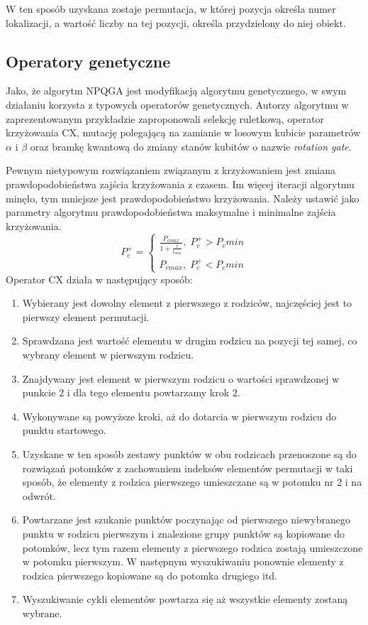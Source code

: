 W ten sposób uzyskana zostaje permutacja, w której pozycja określa numer lokalizacji, a wartość liczby na tej pozycji, określa przydzielony do niej obiekt.

\subsection{Operatory genetyczne}
Jako, że algorytm NPQGA jest modyfikacją algorytmu genetycznego, w swym działaniu korzysta z typowych operatorów genetycznych. Autorzy algorytmu w zaprezentowanym przykładzie zaproponowali selekcję ruletkową, operator krzyżowania CX, mutację polegającą na zamianie w losowym kubicie parametrów $\alpha$ i $\beta$ oraz bramkę kwantową do zmiany stanów kubitów o nazwie \textit{rotation gate}.

Pewnym nietypowym rozwiązaniem związanym z krzyżowaniem jest zmiana prawdopodobieństwa zajścia krzyżowania z czasem. Im więcej iteracji algorytmu minęło, tym mniejsze jest prawdopodobieństwo krzyżowania. Należy ustawić jako parametry algorytmu prawdopodobieństwa maksymalne i minimalne zajścia krzyżowania.
\newline
\begin{equation}
P_c^+= \left\{ \begin{array}{ccc} \frac{P_{c max}}{1+\frac{t}{t_{max}}}, \; P_c^+ > P_c min \\ P_{c max}, \; P_c^+ < P_c min \end{array} \right.
\end{equation}
\newline
Operator CX działa w następujący sposób:
\begin{enumerate}
\item Wybierany jest dowolny element z pierwszego z rodziców, najczęściej jest to pierwszy element permutacji.
\item Sprawdzana jest wartość elementu w drugim rodzicu na pozycji tej samej, co wybrany element w pierwszym rodzicu.
\item Znajdywany jest element w pierwszym rodzicu o wartości sprawdzonej w punkcie 2 i dla tego elementu powtarzamy krok 2.
\item Wykonywane są powyższe kroki, aż do dotarcia w pierwszym rodzicu do punktu startowego.
\item Uzyskane w ten sposób zestawy punktów w obu rodzicach przenoszone są do rozwiązań potomków z zachowaniem indeksów elementów permutacji w taki sposób, że elementy z rodzica pierwszego umieszczane są w potomku nr 2 i na odwrót.
\item Powtarzane jest szukanie punktów poczynając od pierwszego niewybranego punktu w rodzicu pierwszym i znalezione grupy punktów są kopiowane do potomków, lecz tym razem elementy z pierwszego rodzica zostają umieszczone w potomku pierwszym. W następnym wyszukiwaniu ponownie elementy z rodzica pierwszego kopiowane są do potomka drugiego itd.
\item Wyszukiwanie cykli elementów powtarza się aż wszystkie elementy zostaną wybrane.
\end{enumerate}

